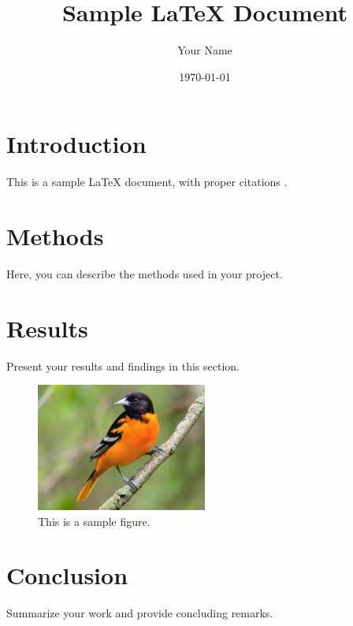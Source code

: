 \documentclass{article}
\begin{document}
\title{Sample LaTeX Document}
\author{Your Name}
\date{\today}

\maketitle

\section{Introduction}
This is a sample LaTeX document, with proper citations \cite{jones2020,brown2019}.

\section{Methods}
Here, you can describe the methods used in your project.

\section{Results}
Present your results and findings in this section.

\begin{figure}[h]
    \centering
    \includegraphics[width=0.5\textwidth]{image_old.jpeg}
    \caption{This is a sample figure.}
    \label{fig:sample}
\end{figure}

\section{Conclusion}
Summarize your work and provide concluding remarks.



\end{document}
